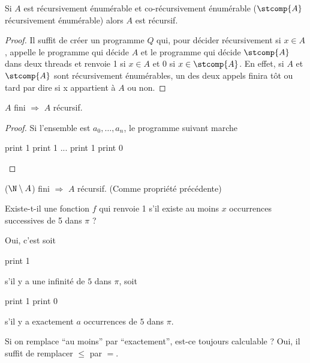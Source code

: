 \begin{myprop}
    Si $A$ est récursivement énumérable et co-récursivement énumérable ($\stcomp{A}$ récursivement énumérable)
    alors $A$ est récursif.
    \begin{proof}
      Il suffit de créer un programme $Q$ qui, pour décider récursivement si $x \in A$, appelle le programme qui décide $A$ et le programme qui décide $\stcomp{A}$ dans deux threads et renvoie 1 si $x \in A$ et 0 si $x \in \stcomp{A}$. En effet, si $A$ et $\stcomp{A}$ sont récursivement énumérables, un des deux appels finira tôt ou tard par dire si x appartient à $A$ ou non.
    \end{proof}
\end{myprop}

\begin{myprop}
	$A$ fini $\Rightarrow$ $A$ récursif.
    \begin{proof}
      Si l'ensemble est $a_0, \ldots, a_n$, le programme suivant marche
      \begin{algorithmic}
        \STATE print 1
        \STATE print 1
        \STATE ...
        \STATE print 1
        \ELSE
        \STATE print 0
        \ENDIF
      \end{algorithmic}
    \end{proof}
\end{myprop}

\begin{myprop}
	($\N \setminus A$) fini $\Rightarrow$ $A$ récursif. (Comme propriété précédente)
\end{myprop}

\begin{myexem}
  Existe-t-il une fonction $f$ qui renvoie 1 s'il existe au moins $x$ occurrences successives de 5 dans $\pi$ ?

  Oui, c'est soit
  \begin{algorithmic}
    \STATE print 1
  \end{algorithmic}
  s'il y a une infinité de $5$ dans $\pi$,
  soit
  \begin{algorithmic}
    \STATE print 1
    \ELSE
    \STATE print 0
    \ENDIF
  \end{algorithmic}
  s'il y a exactement $a$ occurrences de $5$ dans $\pi$.

  Si on remplace ``au moins'' par ``exactement'', est-ce toujours calculable ?
  Oui, il suffit de remplacer $\leq$ par $=$.
\end{myexem}


